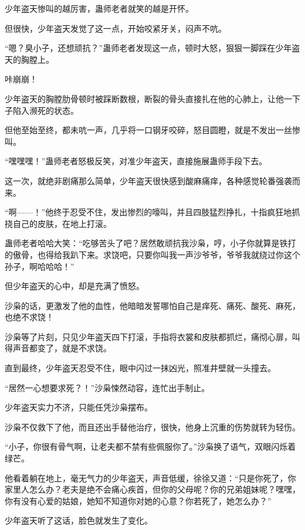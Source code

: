 
\begin{this_body}

少年盗天惨叫的越厉害，蛊师老者就笑的越是开怀。

但很快，少年盗天发觉了这一点，开始咬紧牙关，闷声不吭。

“嗯？臭小子，还想顽抗？”蛊师老者发现这一点，顿时大怒，狠狠一脚踩在少年盗天的胸膛上。

咔崩崩！

少年盗天的胸膛肋骨顿时被踩断数根，断裂的骨头直接扎在他的心肺上，让他一下子陷入濒死的状态。

但他至始至终，都未吭一声，几乎将一口钢牙咬碎，怒目圆瞪，就是不发出一丝惨叫。

“嘿嘿嘿！”蛊师老者怒极反笑，对准少年盗天，直接施展蛊师手段下去。

这一次，就绝非剧痛那么简单，少年盗天很快感到酸麻痛痒，各种感觉轮番强袭而来。

“啊——！”他终于忍受不住，发出惨烈的嚎叫，并且四肢猛烈挣扎，十指疯狂地抓挠自己的皮肤，在地上打滚。

蛊师老者哈哈大笑：“吃够苦头了吧？居然敢顽抗我沙枭，哼，小子你就算是铁打的傲骨，也得给我趴下来。求饶吧，只要你叫我一声沙爷爷，爷爷我就绕过你这个孙子，啊哈哈哈！”

但少年盗天的心中，却是充满了愤怒。

沙枭的话，更激发了他的血性，他暗暗发誓哪怕自己是痒死、痛死、酸死、麻死，也绝不求饶！

沙枭等了片刻，只见少年盗天四下打滚，手指将衣裳和皮肤都抓烂，痛彻心扉，叫得声音都变了，就是不求饶。

直到最终，少年盗天忍受不住，眼中闪过一抹凶光，照准井壁就一头撞去。

“居然一心想要求死？！”沙枭悚然动容，连忙出手制止。

少年盗天实力不济，只能任凭沙枭摆布。

沙枭不仅救下了他，而且还出手替他治疗，很快，他身上沉重的伤势就转为轻伤。

“小子，你很有骨气啊，让老夫都不禁有些佩服你了。”沙枭换了语气，双眼闪烁着绿芒。

他看着躺在地上，毫无气力的少年盗天，声音低缓，徐徐又道：“只是你死了，你家里人怎么办？老夫是绝不会痛心疾首，但你的父母呢？你的兄弟姐妹呢？嘿嘿，你有没有心爱的姑娘，她知不知道你对她的心意？你若死了，她怎么办？”

少年盗天听了这话，脸色就发生了变化。


\end{this_body}
